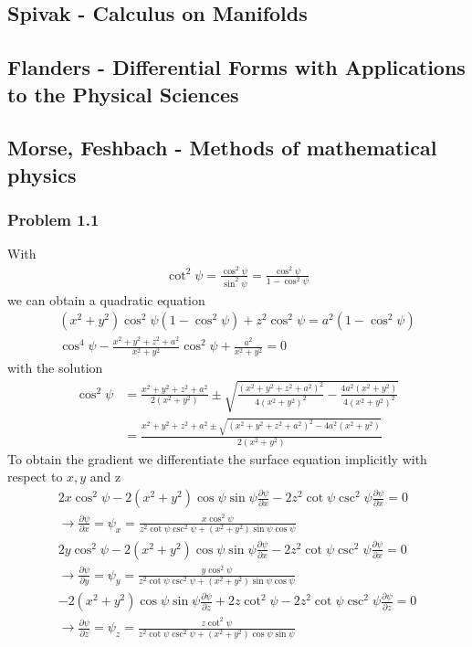\documentclass[10pt,a4paper]{article}
\theoremstyle{definition}
\begin{document}
\subsection{{\sc Spivak} - Calculus on Manifolds}
\subsection{{\sc Flanders} - Differential Forms with Applications to the Physical Sciences}
\subsection{{\sc Morse, Feshbach} - Methods of mathematical physics}
\subsubsection{Problem 1.1}
With
\begin{align}
    \cot^2\psi=\frac{\cos^2\psi}{\sin^2\psi}=\frac{\cos^2\psi}{1-\cos^2\psi}
\end{align}
we can obtain a quadratic equation
\begin{align}
    (x^2+y^2)\cos^2\psi(1-\cos^2\psi)+z^2\cos^2\psi=a^2(1-\cos^2\psi)\\
    \cos^4\psi-\frac{x^2+y^2+z^2+a^2}{x^2+y^2}\cos^2\psi+\frac{a^2}{x^2+y^2}=0
\end{align}
with the solution
\begin{align}
    \cos^2\psi
    &=\frac{x^2+y^2+z^2+a^2}{2(x^2+y^2)}\pm\sqrt{ \frac{(x^2+y^2+z^2+a^2)^2}{4(x^2+y^2)^2}-\frac{4a^2(x^2+y^2)}{4(x^2+y^2)^2}  }\\
    &=\frac{x^2+y^2+z^2+a^2\pm\sqrt{ (x^2+y^2+z^2+a^2)^2-4a^2(x^2+y^2)}}{2(x^2+y^2)}
\end{align}
To obtain the gradient we differentiate the surface equation implicitly with respect to $x,y$ and z
\begin{align}
    2x\cos^2\psi-2(x^2+y^2)\cos\psi\sin\psi\frac{\partial\psi}{\partial x}-2z^2\cot\psi\csc^2\psi\frac{\partial\psi}{\partial x}=0\\
    \rightarrow\frac{\partial\psi}{\partial x}=\psi_x=\frac{x\cos^2\psi}{z^2\cot\psi\csc^2\psi+(x^2+y^2)\sin\psi\cos\psi}\\
    2y\cos^2\psi-2(x^2+y^2)\cos\psi\sin\psi\frac{\partial\psi}{\partial x}-2z^2\cot\psi\csc^2\psi\frac{\partial\psi}{\partial x}=0\\
    \rightarrow\frac{\partial\psi}{\partial y}=\psi_y=\frac{y\cos^2\psi}{z^2\cot\psi\csc^2\psi+(x^2+y^2)\sin\psi\cos\psi}\\
    -2(x^2+y^2)\cos\psi\sin\psi\frac{\partial\psi}{\partial z}+2z\cot^2\psi-2z^2\cot\psi\csc^2\psi\frac{\partial\psi}{\partial z}=0\\
     \rightarrow\frac{\partial\psi}{\partial z}=\psi_z=\frac{z\cot^2\psi}{z^2\cot\psi\csc^2\psi + (x^2+y^2)\cos\psi\sin\psi}
\end{align}
\end{document}
